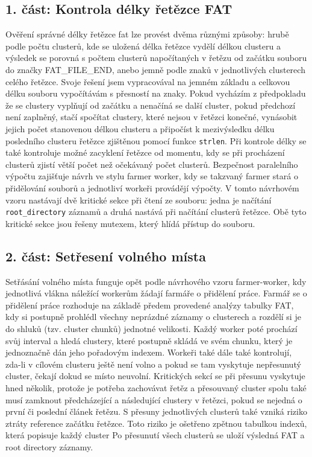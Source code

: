 \documentclass[12pt,a4paper]{article}
\begin{document}
\subsection{1. část: Kontrola délky řetězce FAT}
Ověření správné délky řetězce fat lze provést dvěma různými způsoby: hrubě podle počtu clusterů, kde se uložená délka řetězce vydělí délkou clusteru a výsledek se porovná s počtem clusterů napočítaných v řetězu od začátku souboru do značky FAT\_FILE\_END, anebo jemně podle znaků v jednotlivých clusterech celého řetězce. Svoje řešení jsem vypracovával na jemném základu a celkovou délku souboru vypočítávám s přesností na znaky. Pokud vycházím z předpokladu že se clustery vyplňují od začátku a nenačíná se další cluster, pokud předchozí není zaplněný, stačí spočítat clustery, které nejsou v řetězci konečné, vynásobit jejich počet stanovenou délkou clusteru a připočíst k mezivýsledku délku posledního clusteru řetězce zjištěnou pomocí funkce \texttt{strlen}.
Při kontrole délky se také kontroluje možné zacyklení řetězce od momentu, kdy se při procházení clusterů zjistí větší počet než očekávaný počet clusterů.
Bezpečnost paralelního výpočtu zajišťuje návrh ve stylu farmer worker, kdy se takzvaný farmer stará o přidělování souborů a jednotliví workeři provádějí výpočty. V tomto návrhovém vzoru nastávají dvě kritické sekce při čtení ze souboru: jedna je načítání \texttt{root\_directory} záznamů a druhá nastává při načítání clusterů řetězce. Obě tyto kritické sekce jsou řešeny mutexem, který hlídá přístup do souboru.
\newpage
\subsection{2. část: Setřesení volného místa}
Setřásání volného místa funguje opět podle návrhového vzoru farmer-worker, kdy jednotlivá vlákna náležící workerům žádají farmáře o přidělení práce. Farmář se o přidělení práce rozhoduje na základě předem provedené analýzy tabulky FAT, kdy si postupně prohlédl všechny neprázdné záznamy o clusterech a rozdělí si je do shluků (tzv. cluster chunků) jednotné velikosti. Každý worker poté prochází svůj interval a hledá clustery, které postupně skládá ve svém chunku, který je jednoznačně dán jeho pořadovým indexem. Workeři také dále také kontrolují, zda-li v cílovém clusteru ještě není volno a pokud se tam vyskytuje nepřesunutý cluster, čekají dokud se místo neuvolní.
Kritických sekcí se při přesunu vyskytuje hned několik, protože je potřeba zachovávat řetěz a přesouvaný cluster spolu také musí zamknout předcházející a následující clustery v řetězci, pokud se nejedná o první či poslední článek řetězu.
S přesuny jednotlivých clusterů také vzniká riziko ztráty reference začátku řetězce. Toto riziko je ošetřeno zpětnou tabulkou indexů, která popisuje každý cluster
Po přesunutí všech clusterů se uloží výsledná FAT a root directory záznamy.
\end{document}
